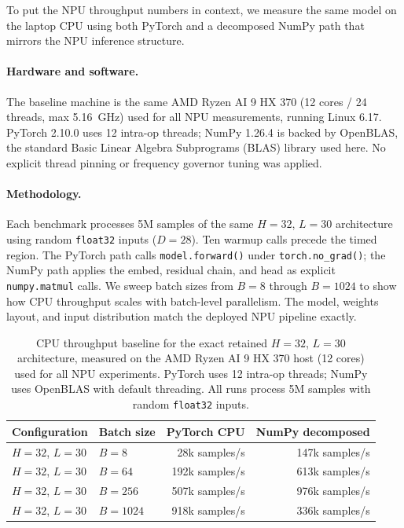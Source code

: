 \documentclass[a4paper,11pt]{article}
\newcommand{\code}[1]{\texttt{#1}}
\begin{document}
To put the NPU throughput numbers in context, we measure the same model on the
laptop CPU using both PyTorch and a decomposed NumPy path that mirrors the NPU
inference structure.

\paragraph{Hardware and software.}
The baseline machine is the same AMD Ryzen AI 9 HX 370 (12 cores / 24 threads,
max 5.16~GHz) used for all NPU measurements, running Linux 6.17. PyTorch
2.10.0 uses 12 intra-op threads; NumPy 1.26.4 is backed by OpenBLAS, the
standard Basic Linear Algebra Subprograms (BLAS) library used here. No explicit
thread pinning or frequency governor tuning was applied.

\paragraph{Methodology.}
Each benchmark processes 5M samples of the same $H=32$, $L=30$ architecture
using random \code{float32} inputs ($D=28$). Ten warmup calls precede the timed
region. The PyTorch path calls \code{model.forward()} under
\code{torch.no\_grad()}; the NumPy path applies the embed, residual chain, and
head as explicit \code{numpy.matmul} calls. We sweep batch sizes from $B=8$
through $B=1024$ to show how CPU throughput scales with batch-level
parallelism. The model, weights layout, and input distribution match the
deployed NPU pipeline exactly.

\begin{table}[t]
\centering
\small
\begin{tabular}{@{}llrr@{}}
\toprule
Configuration & Batch size & PyTorch CPU & NumPy decomposed \\
\midrule
$H=32$, $L=30$ & $B=8$    & 28k samples/s  & 147k samples/s \\
$H=32$, $L=30$ & $B=64$   & 192k samples/s & 613k samples/s \\
$H=32$, $L=30$ & $B=256$  & 507k samples/s & 976k samples/s \\
$H=32$, $L=30$ & $B=1024$ & 918k samples/s & 336k samples/s \\
\bottomrule
\end{tabular}
\caption{CPU throughput baseline for the exact retained $H=32$, $L=30$
architecture, measured on the AMD Ryzen AI 9 HX 370 host (12 cores) used for
all NPU experiments. PyTorch uses 12 intra-op threads; NumPy uses OpenBLAS
with default threading. All runs process 5M samples with random
\code{float32} inputs.}
\label{tab:cpu-baseline}
\end{table}
\end{document}
